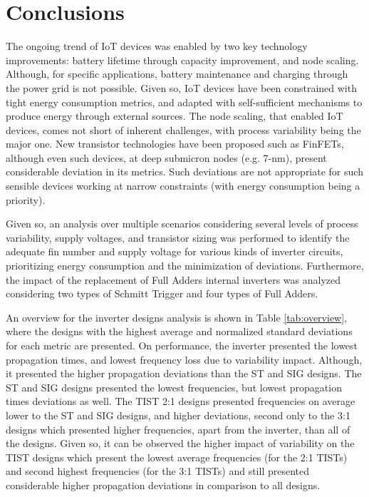 \documentclass[pgmicro,diss,english]{iiufrgs}
\begin{document}


\chapter{Conclusions}

The ongoing trend of IoT devices was enabled by two key technology improvements: battery lifetime through capacity improvement, and node scaling. Although, for specific applications, battery maintenance and charging through the power grid is not possible. Given so, IoT devices have been constrained with tight energy consumption metrics, and adapted with self-sufficient mechanisms to produce energy through external sources. The node scaling, that enabled IoT devices, comes not short of inherent challenges, with process variability being the major one. New transistor technologies have been proposed such as FinFETs, although even such devices, at deep submicron nodes (e.g. 7-nm), present considerable deviation in its metrics. Such deviations are not appropriate for such sensible devices working at narrow constraints (with energy consumption being a priority).

Given so, an analysis over multiple scenarios considering several levels of process variability, supply voltages, and transistor sizing was performed to identify the adequate fin number and supply voltage for various kinds of inverter circuits, prioritizing energy consumption and the minimization of deviations. Furthermore, the impact of the replacement of Full Adders internal inverters was analyzed considering two types of Schmitt Trigger and four types of Full Adders.

An overview for the inverter designs analysis is shown in Table \ref{tab:overview}, where the designs with the highest average and normalized standard deviations for each metric are presented. On performance, the inverter presented the lowest propagation times, and lowest frequency loss due to variability impact. Although, it presented the higher propagation deviations than the ST and SIG designs. The ST and SIG designs presented the lowest frequencies, but lowest propagation times deviations as well. The TIST 2:1 designs presented frequencies on average lower to the ST and SIG designs, and higher deviations, second only to the 3:1 designs which presented higher frequencies, apart from the inverter, than all of the designs. Given so, it can be observed the higher impact of variability on the TIST designs which present the lowest average frequencies (for the 2:1 TISTs) and second highest frequencies (for the 3:1 TISTs) and still presented considerable higher propagation deviations in comparison to all designs.
\end{document}
